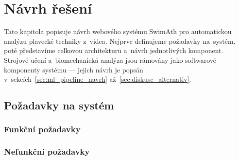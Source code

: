 \chapter{Návrh řešení}
\label{ch:navrh}

Tato kapitola popisuje návrh webového systému SwimAth pro automatickou analýzu plavecké techniky z~videa.
Nejprve definujeme požadavky na~systém, poté představíme celkovou architekturu a~návrh jednotlivých komponent.
Strojové učení a~biomechanická analýza jsou rámovány jako softwarové komponenty systému --- jejich návrh je popsán v~sekcích~\ref{sec:ml_pipeline_navrh} až~\ref{sec:diskuse_alternativ}.


\section{Požadavky na systém}
\label{sec:pozadavky}


\subsection{Funkční požadavky}


\subsection{Nefunkční požadavky}


